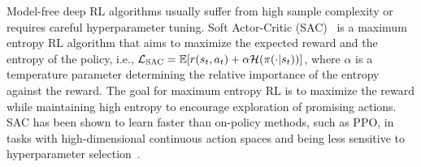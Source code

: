Model-free deep RL algorithms usually suffer from high sample complexity or requires careful hyperparameter tuning. Soft Actor-Critic (SAC)~ is a maximum entropy RL algorithm that aims to maximize the expected reward and the entropy of the policy, i.e., ${\mathcal{L}}_{\text{SAC}} = \mathbb{E}[r(s_t, a_t) + \alpha {\mathcal{H}}(\pi(\cdot | s_t))]$, where $\alpha$ is a temperature parameter determining the relative importance of the entropy against the reward. The goal for maximum entropy RL is to maximize the reward while maintaining high entropy to encourage exploration of promising actions. SAC has been shown to learn faster than on-policy methods, such as PPO, in tasks with high-dimensional continuous action spaces and being less sensitive to hyperparameter selection~. 
